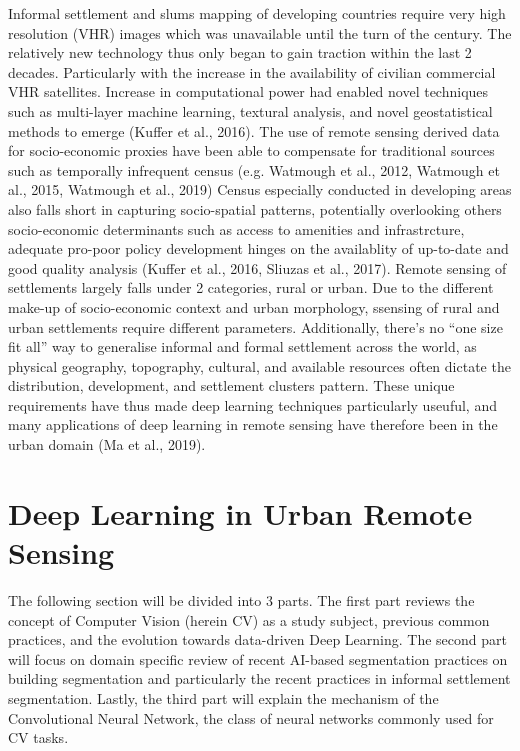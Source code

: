 \documentclass[11pt, a4paper, twoside]{report}
\begin{document}
Informal settlement and slums mapping of developing countries require very high resolution (VHR) images which was unavailable until the turn of the century. The relatively new technology thus only began to gain traction within the last 2 decades. Particularly with the increase in the availability of civilian commercial VHR satellites. Increase in computational power had enabled novel techniques such as multi-layer machine learning, textural analysis, and novel geostatistical methods to emerge (Kuffer et al., 2016). The use of remote sensing derived data for socio-economic proxies have been able to compensate for traditional sources such as temporally infrequent census (e.g. Watmough et al., 2012, Watmough et al., 2015, Watmough et al., 2019) Census especially conducted in developing areas also falls short in capturing socio-spatial patterns, potentially overlooking others socio-economic determinants such as access to amenities and infrastrcture, adequate pro-poor policy development hinges on the availablity of up-to-date and good quality analysis (Kuffer et al., 2016, Sliuzas et al., 2017). Remote sensing of settlements largely falls under 2 categories, rural or urban. Due to the different make-up of socio-economic context and urban morphology, ssensing of rural and urban settlements require different parameters. Additionally, there’s no “one size fit all” way to generalise informal and formal settlement across the world, as physical geography, topography, cultural, and available resources often dictate the distribution, development, and settlement clusters pattern. These unique requirements have thus made deep learning techniques particularly useuful, and many applications of deep learning in remote sensing have therefore been in the urban domain (Ma et al., 2019).

\section{Deep Learning in Urban Remote Sensing}\label{DLinRS}

The following section will be divided into 3 parts. The first part reviews the concept of Computer Vision (herein CV) as a study subject, previous common practices, and the evolution towards data-driven Deep Learning. The second part will focus on domain specific review of recent AI-based segmentation practices on building segmentation and particularly the recent practices in informal settlement segmentation. Lastly, the third part will explain the mechanism of the Convolutional Neural Network, the class of neural networks commonly used for CV tasks.\\\par
\end{document}
